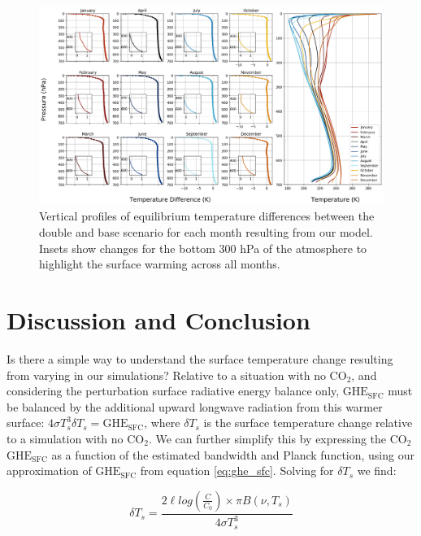 \documentclass[draft]{agujournal2019}
\begin{document}
\begin{figure}[htb!]
\noindent\includegraphics[width=1\textwidth]{figures/temp_dif.png}
\centering
\caption{Vertical profiles of equilibrium temperature differences between the double and base  scenario for each month resulting from our model. Insets show changes for the bottom 300 hPa of the atmosphere to highlight the surface warming across all months.}
\label{fig:temp_dif}
\end{figure}


\section{Discussion and Conclusion}\label{section:discussion} 
%

Is there a simple way to understand the surface temperature change resulting from varying  in our simulations? Relative to a situation with no CO$_2$, and considering the perturbation surface radiative energy balance only, $\text{GHE}_\text{{SFC}}$ must be balanced by the additional upward longwave radiation from this warmer surface: $ 4 \sigma T_s^3 \delta T_s = \text{GHE}_{\text{SFC}}$, where $\delta T_s$ is the surface temperature change relative to a simulation with no CO$_2$. We can further simplify this by expressing the CO$_2$ $\text{GHE}_\text{{SFC}}$ as a function of the estimated bandwidth and Planck function, using our approximation of $\text{GHE}_\text{{SFC}}$ from equation \ref{eq:ghe_sfc}. Solving for $\delta T_s$ we find:

\begin{equation}\label{eq:del_ts_planck}
    \delta T_s = \frac{2\ell log(\frac{C}{C_0}) \times \pi B(\nu, T_s)}{4\sigma T_s^3}
\end{equation}
\end{document}
